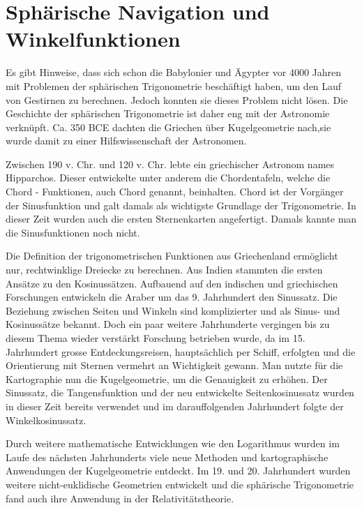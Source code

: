 


\section{Sphärische Navigation und Winkelfunktionen}
Es gibt Hinweise, dass sich schon die Babylonier und Ägypter vor 4000 Jahren mit Problemen der sphärischen Trigonometrie beschäftigt haben, um den Lauf von Gestirnen zu berechnen. 
Jedoch konnten sie dieses Problem nicht lösen. 
Die Geschichte der sphärischen Trigonometrie ist daher eng mit der Astronomie verknüpft. Ca. 350 BCE dachten die Griechen über Kugelgeometrie nach,sie wurde damit zu einer Hilfswissenschaft der Astronomen. 

Zwischen 190 v. Chr. und 120 v. Chr. lebte ein griechischer Astronom names Hipparchos. 
Dieser entwickelte unter anderem die Chordentafeln, welche die Chord - Funktionen, auch Chord genannt, beinhalten.
Chord ist der Vorgänger der Sinusfunktion und galt damals als wichtigste Grundlage der Trigonometrie.
In dieser Zeit wurden auch die ersten Sternenkarten angefertigt. Damals kannte man die Sinusfunktionen noch nicht. 

Die Definition der trigonometrischen Funktionen aus Griechenland ermöglicht nur, rechtwinklige Dreiecke zu berechnen.
Aus Indien stammten die ersten Ansätze zu den Kosinussätzen.
Aufbauend auf den indischen und griechischen Forschungen entwickeln die Araber um das 9. Jahrhundert den Sinussatz.  
Die Beziehung zwischen Seiten und Winkeln sind komplizierter und als Sinus- und Kosinussätze bekannt.
Doch ein paar weitere Jahrhunderte vergingen bis zu diesem Thema wieder verstärkt Forschung betrieben wurde, da im 15. Jahrhundert grosse Entdeckungsreisen, hauptsächlich per Schiff, erfolgten und die Orientierung mit Sternen vermehrt an Wichtigkeit gewann.
Man nutzte für die Kartographie nun die Kugelgeometrie, um die Genauigkeit zu erhöhen.
Der Sinussatz, die Tangensfunktion und der neu entwickelte Seitenkosinussatz wurden in dieser Zeit bereits verwendet und im darauffolgenden Jahrhundert folgte der Winkelkosinussatz. 

Durch weitere mathematische Entwicklungen wie den Logarithmus wurden im Laufe des nächsten Jahrhunderts viele neue Methoden und kartographische Anwendungen der Kugelgeometrie entdeckt. 
Im 19. und 20. Jahrhundert wurden weitere nicht-euklidische Geometrien entwickelt und die sphärische Trigonometrie fand auch ihre Anwendung in der Relativitätstheorie.